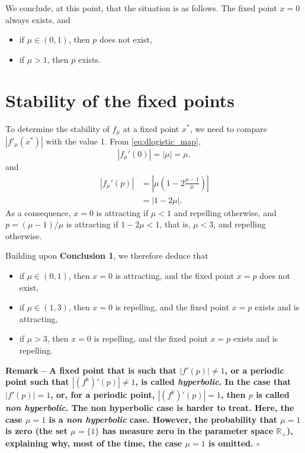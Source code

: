 \documentclass[12pt]{article}
\theoremstyle{plain}
\newenvironment{remark}{\vskip0.2cm\par\noindent\begin{small}\bf Remark\,\,\rm --}{\hfill{$\circ$}\end{small}\par\vskip0.25cm}
\def\IR{\mathbb{R}}
\begin{document}
\vskip0.5cm
 We conclude, at this point, that the situation is as follows. The fixed point $x=0$ always exists, and
\begin{itemize}
\item if $\mu\in(0,1)$, then $p$ does not exist,
\item if $\mu>1$, then $p$ exists.
\end{itemize}


\section{Stability of the fixed points}
To determine the stability of $f_\mu$ at a fixed point $x^*$, we need to compare $|f'_\mu(x^*)|$ with the value 1. From \eqref{eq:dlogistic_map},
\[
|f_\mu'(0)|=|\mu|=\mu,
\]
and
\begin{align*}
|f_\mu'(p)| &= \left|\mu\left(1-2\frac{\mu-1}{\mu}\right)\right| \\
&= |1-2\mu|.
\end{align*}
As a consequence, $x=0$ is attracting if $\mu<1$ and repelling otherwise, and $p=(\mu-1)/\mu$ is attracting if $1-2\mu<1$, that is, $\mu<3$, and repelling otherwise.

\vskip0.5cm
 Building upon {\bf Conclusion 1}, we therefore deduce that
\begin{itemize}
\item if $\mu\in(0,1)$, then $x=0$ is attracting, and the fixed point $x=p$ does not exist,
\item if $\mu\in(1,3)$, then $x=0$ is repelling, and the fixed point $x=p$ exists and is attracting,
\item if $\mu>3$, then $x=0$ is repelling, and the fixed point $x=p$ exists and is repelling.
\end{itemize}


\begin{remark}
A fixed point that is such that $|f'(p)|\neq 1$, or a periodic point such that $|(f^k)'(p)|\neq 1$, is called \emph{hyperbolic}. In the case that $|f'(p)|=1$, or, for a periodic point, $|(f^k)'(p)|=1$, then $p$ is called \emph{non hyperbolic}. The non hyperbolic case is harder to treat. Here, the case $\mu=1$ is a \emph{non hyperbolic} case. However, the probability that $\mu=1$ is zero (the set $\mu=\{1\}$ has measure zero in the parameter space $\IR_+$), explaining why, most of the time, the case $\mu=1$ is omitted.
\end{remark}
\end{document}
